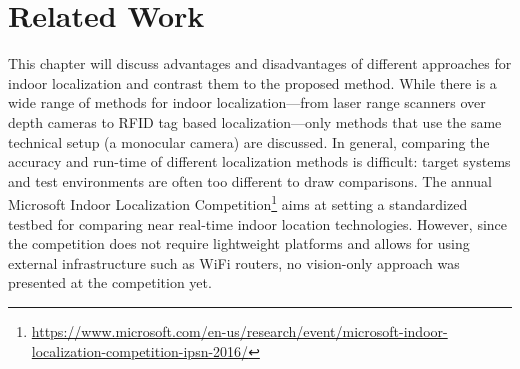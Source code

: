 \chapter{Related Work}
\label{chap:relatedwork}

This chapter will discuss advantages and disadvantages of different approaches for indoor localization and
contrast them to the proposed method. While there is a wide range of methods for indoor localization---from laser range scanners over depth cameras to RFID tag based localization---only methods that use the same technical setup (a monocular camera) are discussed. In general, comparing the accuracy and run-time of different localization methods is difficult: target systems and test environments are often too different to draw comparisons. The annual Microsoft Indoor Localization Competition\footnote{\url{https://www.microsoft.com/en-us/research/event/microsoft-indoor-localization-competition-ipsn-2016/}} aims at setting a standardized testbed for comparing near real-time indoor location technologies. However, since the competition does not require lightweight platforms and allows for using external infrastructure such as WiFi routers, no vision-only approach was presented at the competition yet.
